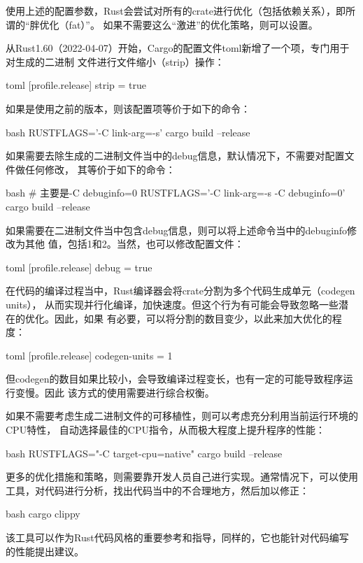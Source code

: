 使用上述的配置参数，Rust会尝试对所有的crate进行优化（包括依赖关系），即所谓的“胖优化（fat）”。
如果不需要这么“激进”的优化策略，则可以设置。

从Rust1.60（2022-04-07）开始，Cargo的配置文件toml新增了一个项，专门用于对生成的二进制
文件进行文件缩小（strip）操作：
\begin{code-block}{toml}
[profile.release]
strip = true
\end{code-block}
如果是使用之前的版本，则该配置项等价于如下的命令：
\begin{code-block}{bash}
RUSTFLAGS='-C link-arg=-s' cargo build --release
\end{code-block}

如果需要去除生成的二进制文件当中的debug信息，默认情况下，不需要对配置文件做任何修改，
其等价于如下的命令：
\begin{code-block}{bash}
# 主要是-C debuginfo=0
RUSTFLAGS='-C link-arg=-s -C debuginfo=0' cargo build --release
\end{code-block}

如果需要在二进制文件当中包含debug信息，则可以将上述命令当中的debuginfo修改为其他
值，包括1和2。当然，也可以修改配置文件：
\begin{code-block}{toml}
[profile.release]
debug = true
\end{code-block}

在代码的编译过程当中，Rust编译器会将crate分割为多个代码生成单元（codegen units），
从而实现并行化编译，加快速度。但这个行为有可能会导致忽略一些潜在的优化。因此，如果
有必要，可以将分割的数目变少，以此来加大优化的程度：
\begin{code-block}{toml}
[profile.release]
codegen-units = 1
\end{code-block}
但codegen的数目如果比较小，会导致编译过程变长，也有一定的可能导致程序运行变慢。因此
该方式的使用需要进行综合权衡。

如果不需要考虑生成二进制文件的可移植性，则可以考虑充分利用当前运行环境的CPU特性，
自动选择最佳的CPU指令，从而极大程度上提升程序的性能：
\begin{code-block}{bash}
RUSTFLAGS="-C target-cpu=native" cargo build --release
\end{code-block}

更多的优化措施和策略，则需要靠开发人员自己进行实现。通常情况下，可以使用
工具，对代码进行分析，找出代码当中的不合理地方，然后加以修正：
\begin{code-block}{bash}
cargo clippy
\end{code-block}
该工具可以作为Rust代码风格的重要参考和指导，同样的，它也能针对代码编写的性能提出建议。

